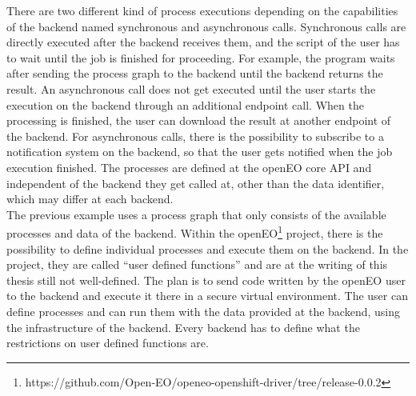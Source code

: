 \documentclass[draft,final]{vutinfth} %
\begin{document}
There are two different kind of process executions depending on the capabilities of the backend named synchronous and asynchronous calls. Synchronous calls are directly executed after the backend receives them, and the script of the user has to wait until the job is finished for proceeding. For example, the program waits after sending the process graph to the backend until the backend returns the result. An asynchronous call does not get executed until the user starts the execution on the backend through an additional endpoint call. When the processing is finished, the user can download the result at another endpoint of the backend. For asynchronous calls, there is the possibility to subscribe to a notification system on the backend, so that the user gets notified when the job execution finished.     
The processes are defined at the openEO core API and independent of the backend they get called at, other than the data identifier, which may differ at each backend.  
\\
The previous example uses a process graph that only consists of the available processes and data of the backend. Within the openEO\footnote{https://github.com/Open-EO/openeo-openshift-driver/tree/release-0.0.2} project, there is the possibility to define individual processes and execute them on the backend. In the project, they are called “user defined functions” and are at the writing of this thesis still not well-defined. The plan is to send code written by the openEO user to the backend and execute it there in a secure virtual environment. The user can define processes and can run them with the data provided at the backend, using the infrastructure of the backend. Every backend has to define what the restrictions on user defined functions are. 
\end{document}
